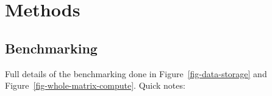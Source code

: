\documentclass[a4paper,num-refs]{oup-contemporary}
\begin{document}



\section{Methods}

\subsection{Benchmarking}
Full details of the benchmarking done in
Figure~\ref{fig-data-storage} and
Figure~\ref{fig-whole-matrix-compute}.
Quick notes:
\end{document}
